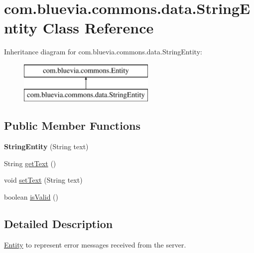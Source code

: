 \hypertarget{classcom_1_1bluevia_1_1commons_1_1data_1_1StringEntity}{
\section{com.bluevia.commons.data.StringEntity Class Reference}
\label{classcom_1_1bluevia_1_1commons_1_1data_1_1StringEntity}
}
Inheritance diagram for com.bluevia.commons.data.StringEntity:\begin{figure}[H]
\begin{center}
\leavevmode
\includegraphics[height=2.000000cm]{classcom_1_1bluevia_1_1commons_1_1data_1_1StringEntity}
\end{center}
\end{figure}
\subsection*{Public Member Functions}
\begin{DoxyCompactItemize}
\item 
\hypertarget{classcom_1_1bluevia_1_1commons_1_1data_1_1StringEntity_ad1cee6326db587c30b89ccb1ffba7fc6}{
{\bfseries StringEntity} (String text)}
\label{classcom_1_1bluevia_1_1commons_1_1data_1_1StringEntity_ad1cee6326db587c30b89ccb1ffba7fc6}

\item 
String \hyperlink{classcom_1_1bluevia_1_1commons_1_1data_1_1StringEntity_a67dd0b6a620ab8077dc342d6694bb483}{getText} ()
\item 
void \hyperlink{classcom_1_1bluevia_1_1commons_1_1data_1_1StringEntity_a5da1d5c4fb98291237e1c92e8a647454}{setText} (String text)
\item 
boolean \hyperlink{classcom_1_1bluevia_1_1commons_1_1data_1_1StringEntity_a8a237cf91db1e39865d1c5d27434179b}{isValid} ()
\end{DoxyCompactItemize}


\subsection{Detailed Description}
\hyperlink{interfacecom_1_1bluevia_1_1commons_1_1Entity}{Entity} to represent error messages received from the server. 

